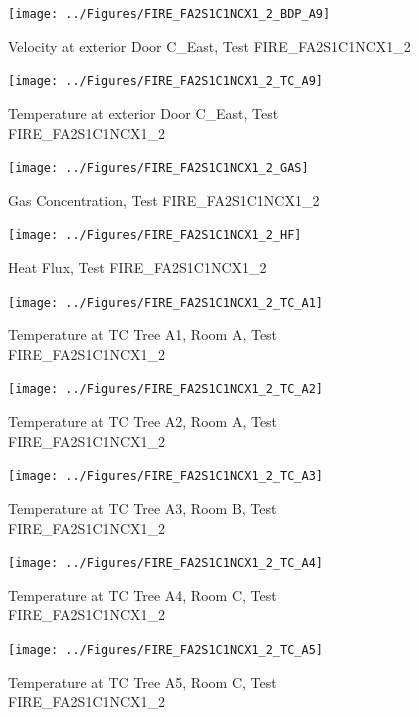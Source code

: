 \documentclass[11pt,oneside]{book}
\begin{document}
\begin{figure}[!ht]
\texttt{[image: ../Figures/FIRE\_FA2S1C1NCX1\_2\_BDP\_A9]}
\caption{Velocity at exterior Door C\_East, Test FIRE\_FA2S1C1NCX1\_2}
\label{fig:FIRE_FA2S1C1NCX1_2_BDP_A9}
\end{figure}

\begin{figure}[!ht]
\texttt{[image: ../Figures/FIRE\_FA2S1C1NCX1\_2\_TC\_A9]}
\caption{Temperature at exterior Door C\_East, Test FIRE\_FA2S1C1NCX1\_2}
\label{fig:FIRE_FA2S1C1NCX1_2_TC_A9}
\end{figure}

\begin{figure}[!ht]
\texttt{[image: ../Figures/FIRE\_FA2S1C1NCX1\_2\_GAS]}
\caption{Gas Concentration, Test FIRE\_FA2S1C1NCX1\_2}
\label{fig:FIRE_FA2S1C1NCX1_2_GAS}
\end{figure}

\begin{figure}[!ht]
\texttt{[image: ../Figures/FIRE\_FA2S1C1NCX1\_2\_HF]}
\caption{Heat Flux, Test FIRE\_FA2S1C1NCX1\_2}
\label{fig:FIRE_FA2S1C1NCX1_2_HF}
\end{figure}

\begin{figure}[!ht]
\texttt{[image: ../Figures/FIRE\_FA2S1C1NCX1\_2\_TC\_A1]}
\caption{Temperature at TC Tree A1, Room A, Test FIRE\_FA2S1C1NCX1\_2}
\label{fig:FIRE_FA2S1C1NCX1_2_TC_A1}
\end{figure}

\begin{figure}[!ht]
\texttt{[image: ../Figures/FIRE\_FA2S1C1NCX1\_2\_TC\_A2]}
\caption{Temperature at TC Tree A2, Room A, Test FIRE\_FA2S1C1NCX1\_2}
\label{fig:FIRE_FA2S1C1NCX1_2_TC_A2}
\end{figure}

\begin{figure}[!ht]
\texttt{[image: ../Figures/FIRE\_FA2S1C1NCX1\_2\_TC\_A3]}
\caption{Temperature at TC Tree A3, Room B, Test FIRE\_FA2S1C1NCX1\_2}
\label{fig:FIRE_FA2S1C1NCX1_2_TC_A3}
\end{figure}

\begin{figure}[!ht]
\texttt{[image: ../Figures/FIRE\_FA2S1C1NCX1\_2\_TC\_A4]}
\caption{Temperature at TC Tree A4, Room C, Test FIRE\_FA2S1C1NCX1\_2}
\label{fig:FIRE_FA2S1C1NCX1_2_TC_A4}
\end{figure}

\begin{figure}[!ht]
\texttt{[image: ../Figures/FIRE\_FA2S1C1NCX1\_2\_TC\_A5]}
\caption{Temperature at TC Tree A5, Room C, Test FIRE\_FA2S1C1NCX1\_2}
\label{fig:FIRE_FA2S1C1NCX1_2_TC_A5}
\end{figure}
\end{document}
